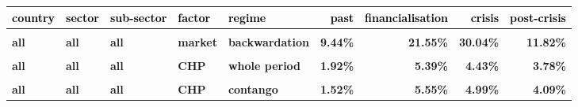 \documentclass[
  authoryear,
  preprint,
  3p]{elsarticle}
\begin{document}
\begin{landscape}
\begin{longtable}[t]{>{}l>{}l>{}l>{}l>{}l>{}r>{}r>{}r>{}r}
\toprule
\textcolor{black}{\textbf{country}} & \textcolor{black}{\textbf{sector}} & \textcolor{black}{\textbf{sub-sector}} & \textcolor{black}{\textbf{factor}} & \textcolor{black}{\textbf{regime}} & \textcolor{black}{\textbf{past}} & \textcolor{black}{\textbf{financialisation}} & \textcolor{black}{\textbf{crisis}} & \textcolor{black}{\textbf{post-crisis}}\\
\midrule
\textbf{\cellcolor{gray!10}{all}} & \textbf{\cellcolor{gray!10}{all}} & \textbf{\cellcolor{gray!10}{all}} & \textbf{\cellcolor{gray!10}{market}} & \textbf{\cellcolor{gray!10}{whole period}} & \textcolor[HTML]{4285f4}{\textbf{\cellcolor{gray!10}{9.69\%}}} & \textcolor[HTML]{4285f4}{\textbf{\cellcolor{gray!10}{19.7\%}}} & \textcolor[HTML]{4285f4}{\textbf{\cellcolor{gray!10}{31.3\%}}} & \textcolor[HTML]{4285f4}{\textbf{\cellcolor{gray!10}{14.73\%}}}\\
\textbf{all} & \textbf{all} & \textbf{all} & \textbf{market} & \textbf{backwardation} & \textcolor[HTML]{4285f4}{\textbf{9.44\%}} & \textcolor[HTML]{4285f4}{\textbf{21.55\%}} & \textcolor[HTML]{4285f4}{\textbf{30.04\%}} & \textcolor[HTML]{4285f4}{\textbf{11.82\%}}\\
\textbf{\cellcolor{gray!10}{all}} & \textbf{\cellcolor{gray!10}{all}} & \textbf{\cellcolor{gray!10}{all}} & \textbf{\cellcolor{gray!10}{market}} & \textbf{\cellcolor{gray!10}{contango}} & \textcolor[HTML]{4285f4}{\textbf{\cellcolor{gray!10}{10.07\%}}} & \textcolor[HTML]{4285f4}{\textbf{\cellcolor{gray!10}{18.15\%}}} & \textcolor[HTML]{4285f4}{\textbf{\cellcolor{gray!10}{32.67\%}}} & \textcolor[HTML]{4285f4}{\textbf{\cellcolor{gray!10}{16.99\%}}}\\
\textbf{all} & \textbf{all} & \textbf{all} & \textbf{CHP} & \textbf{whole period} & \textcolor[HTML]{4285f4}{\textbf{1.92\%}} & \textcolor[HTML]{4285f4}{\textbf{5.39\%}} & \textcolor[HTML]{4285f4}{\textbf{4.43\%}} & \textcolor[HTML]{4285f4}{\textbf{3.78\%}}\\
\textbf{\cellcolor{gray!10}{all}} & \textbf{\cellcolor{gray!10}{all}} & \textbf{\cellcolor{gray!10}{all}} & \textbf{\cellcolor{gray!10}{CHP}} & \textbf{\cellcolor{gray!10}{backwardation}} & \textcolor[HTML]{4285f4}{\textbf{\cellcolor{gray!10}{2.6\%}}} & \textcolor[HTML]{4285f4}{\textbf{\cellcolor{gray!10}{5.61\%}}} & \textcolor[HTML]{4285f4}{\textbf{\cellcolor{gray!10}{4\%}}} & \textcolor[HTML]{4285f4}{\textbf{\cellcolor{gray!10}{4.57\%}}}\\
\addlinespace
\textbf{all} & \textbf{all} & \textbf{all} & \textbf{CHP} & \textbf{contango} & \textcolor[HTML]{4285f4}{\textbf{1.52\%}} & \textcolor[HTML]{4285f4}{\textbf{5.55\%}} & \textcolor[HTML]{4285f4}{\textbf{4.99\%}} & \textcolor[HTML]{4285f4}{\textbf{4.09\%}}\\

\end{longtable}
\end{landscape}
\end{document}
